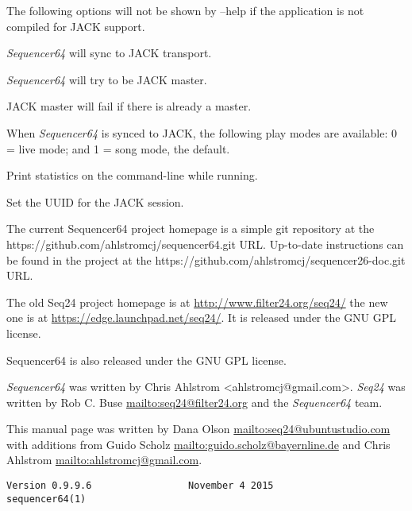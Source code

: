       The following options will not be shown by --help if the application is
      not compiled for JACK support.

      \textsl{Sequencer64} will sync to JACK transport.

      \textsl{Sequencer64} will try to be JACK master.

      JACK master will fail if there is already a master.

      When \textsl{Sequencer64} is synced to JACK, the following play modes
      are available: 0 = live mode; and 1 = song mode, the default.

      Print statistics on the command-line while running.

      Set the UUID for the JACK session.

   The current Sequencer64 project homepage is a simple git repository at the
   https://github.com/ahlstromcj/sequencer64.git URL.
   Up-to-date instructions can be found in the project at the
   https://github.com/ahlstromcj/sequencer26-doc.git URL.

   The old Seq24 project homepage is at
   \url{http://www.filter24.org/seq24/} the new
   one is at \url{https://edge.launchpad.net/seq24/}.
   It is released under the GNU GPL license.

   Sequencer64 is also released under the GNU GPL license.

   \textsl{Sequencer64} was written by Chris Ahlstrom <ahlstromcj@gmail.com>.
   \textsl{Seq24} was written by Rob C. Buse \url{mailto:seq24@filter24.org}
   and the \textsl{Sequencer64} team.

   This manual page was written by Dana Olson
   \url{mailto:seq24@ubuntustudio.com} with additions from Guido Scholz
   \url{mailto:guido.scholz@bayernline.de} and Chris Ahlstrom
   \url{mailto:ahlstromcj@gmail.com}.

   \begin{verbatim}
Version 0.9.9.6                 November 4 2015                  sequencer64(1)
   \end{verbatim}

